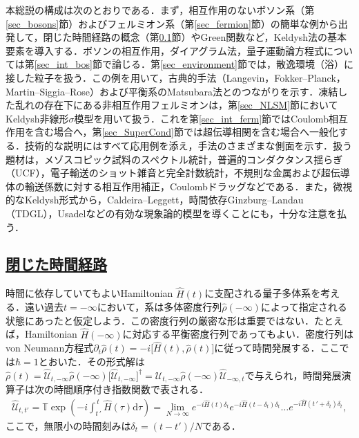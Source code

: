 \documentclass[a4paper,11pt]{ltjsarticle}
\newcommand{\subsectionlink}[1]{\subsection[#1]{\hyperlink{toc}{#1}}}
\begin{document}
本総説の構成は次のとおりである．まず，相互作用のないボソン系（第\ref{sec_bosons}節）およびフェルミオン系（第\ref{sec_fermion}節）の簡単な例から出発して，閉じた時間経路の概念（第\ref{sec_contour}節）やGreen関数など，Keldysh法の基本要素を導入する．ボソンの相互作用，ダイアグラム法，量子運動論方程式については第\ref{sec_int_bos}節で論じる．第\ref{sec_environment}節では，散逸環境（浴）に接した粒子を扱う．この例を用いて，古典的手法（Langevin，Fokker--Planck，Martin--Siggia--Rose）および平衡系のMatsubara法とのつながりを示す．凍結した乱れの存在下にある非相互作用フェルミオンは，第\ref{sec_NLSM}節においてKeldysh非線形$\sigma$模型を用いて扱う．これを第\ref{sec_int_ferm}節ではCoulomb相互作用を含む場合へ，第\ref{sec_SuperCond}節では超伝導相関を含む場合へ一般化する．技術的な説明にはすべて応用例を添え，手法のさまざまな側面を示す．扱う題材は，メゾスコピック試料のスペクトル統計，普遍的コンダクタンス揺らぎ（UCF），電子輸送のショット雑音と完全計数統計，不規則な金属および超伝導体の輸送係数に対する相互作用補正，Coulombドラッグなどである．また，微視的なKeldysh形式から，Caldeira--Leggett，時間依存Ginzburg--Landau（TDGL），Usadelなどの有効な現象論的模型を導くことにも，十分な注意を払う．


\subsectionlink{閉じた時間経路}\label{sec_contour}


時間に依存していてもよいHamiltonian $\hat{H}(t)$に支配される量子多体系を考える．遠い過去$t=-\infty$において，系は多体密度行列$\hat{\rho}(-\infty)$によって指定される状態にあったと仮定しよう．この密度行列の厳密な形は重要ではない．たとえば，Hamiltonian $\hat{H}(-\infty)$に対応する平衡密度行列であってもよい．密度行列はvon Neumann方程式$\partial_{t}\hat{\rho}(t)=-i\big[\hat{H}(t),\hat{\rho}(t)\big]$に従って時間発展する．ここでは$\hbar=1$とおいた．その形式解は$\hat{\rho}(t)=\hat{\mathcal{U}}_{t,-\infty}\hat{\rho}(-\infty)
\big[\hat{\mathcal{U}}_{t,-\infty}\big]^{\dag}=
\hat{\mathcal{U}}_{t,-\infty}\hat{\rho}(-\infty)
\hat{\mathcal{U}}_{-\infty,t}$で与えられ，時間発展演算子は次の時間順序付き指数関数で表される．
\begin{eqnarray}
\hat{\mathcal{U}}_{t,t'}=\mathbb{T}\exp\left(-i\int^{\,t}_{t\,'}
\hat{H}(\tau)\mathrm{d}\tau\right)=\lim_{N\rightarrow\infty}
e^{-i\hat{H}(t)\delta_{t}}e^{-i\hat{H}(t-\delta_{t})\delta_{t}}\ldots
e^{-i\hat{H}(t\,'+\delta_{t})\delta_{t}},
\end{eqnarray}ここで，無限小の時間刻みは$\delta_{t}=(t-t')/N$である．
\end{document}
